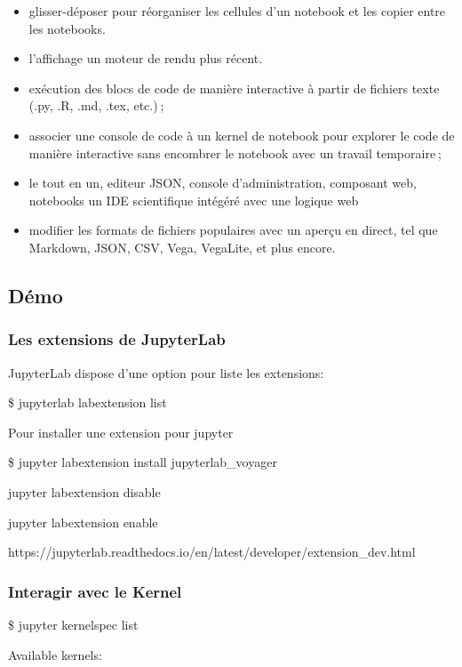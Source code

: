 \documentclass[11pt]{article}
\providecommand{\tightlist}{%
      \setlength{\itemsep}{0pt}\setlength{\parskip}{0pt}}
\begin{document}
\begin{itemize}
\tightlist
\item
  glisser-déposer pour réorganiser les cellules d'un notebook et les
  copier entre les notebooks.
\item
  l'affichage un moteur de rendu plus récent.
\item
  exécution des blocs de code de manière interactive à partir de
  fichiers texte (.py, .R, .md, .tex, etc.) ;
\item
  associer une console de code à un kernel de notebook pour explorer le
  code de manière interactive sans encombrer le notebook avec un travail
  temporaire ;
\item
  le tout en un, editeur JSON, console d'administration, composant web,
  notebooks un IDE scientifique intégéré avec une logique web
\item
  modifier les formats de fichiers populaires avec un aperçu en direct,
  tel que Markdown, JSON, CSV, Vega, VegaLite, et plus encore.
\end{itemize}

    \subsection{Démo}\label{duxe9mo}

    \subsubsection{Les extensions de
JupyterLab}\label{les-extensions-de-jupyterlab}

JupyterLab dispose d'une option pour liste les extensions:

\$ jupyterlab labextension list

Pour installer une extension pour jupyter

\$ jupyter labextension install jupyterlab\_voyager

jupyter labextension disable

jupyter labextension enable

https://jupyterlab.readthedocs.io/en/latest/developer/extension\_dev.html

    \subsubsection{Interagir avec le Kernel}\label{interagir-avec-le-kernel}

\$ jupyter kernelspec list

Available kernels:
\end{document}
